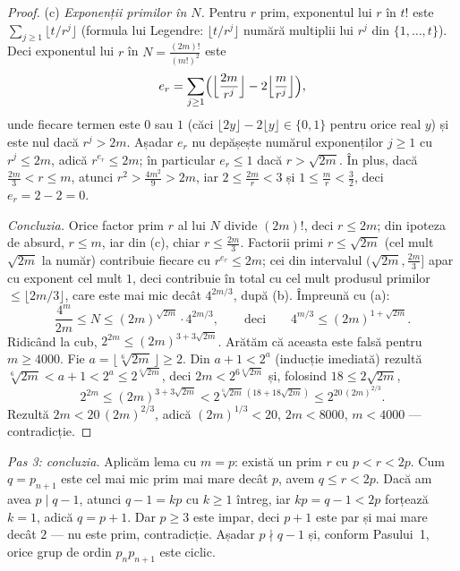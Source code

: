 \begin{solutie}
\begin{proof}
(c) \emph{Exponenții primilor în $N$.} Pentru $r$ prim, exponentul lui
$r$ în $t!$ este $\sum_{j\ge 1}\lfloor t/r^{j}\rfloor$ (formula lui
Legendre: $\lfloor t/r^{j}\rfloor$ numără multiplii lui $r^{j}$ din
$\{1,\dots,t\}$). Deci exponentul lui $r$ în $N=\frac{(2m)!}{(m!)^{2}}$
este
\[
  e_{r}=\sum_{j\ge 1}\Bigl(\Bigl\lfloor\frac{2m}{r^{j}}\Bigr\rfloor
  -2\Bigl\lfloor\frac{m}{r^{j}}\Bigr\rfloor\Bigr),
\]
unde fiecare termen este $0$ sau $1$ (căci
$\lfloor 2y\rfloor-2\lfloor y\rfloor\in\{0,1\}$ pentru orice real $y$)
și este nul dacă $r^{j}>2m$. Așadar $e_{r}$ nu depășește numărul
exponenților $j\ge 1$ cu $r^{j}\le 2m$, adică $r^{e_{r}}\le 2m$; în
particular $e_{r}\le 1$ dacă $r>\sqrt{2m}$. În plus, dacă
$\frac{2m}{3}<r\le m$, atunci $r^{2}>\frac{4m^{2}}{9}>2m$, iar
$2\le\frac{2m}{r}<3$ și $1\le\frac{m}{r}<\frac32$, deci $e_{r}=2-2=0$.

\emph{Concluzia.} Orice factor prim $r$ al lui $N$ divide $(2m)!$, deci
$r\le 2m$; din ipoteza de absurd, $r\le m$, iar din (c), chiar
$r\le\frac{2m}{3}$. Factorii primi $r\le\sqrt{2m}$ (cel mult
$\sqrt{2m}$ la număr) contribuie fiecare cu $r^{e_{r}}\le 2m$; cei din
intervalul $\bigl(\sqrt{2m},\frac{2m}{3}\bigr]$ apar cu exponent cel mult
$1$, deci contribuie în total cu cel mult produsul primilor
$\le\lfloor 2m/3\rfloor$, care este mai mic decât $4^{2m/3}$, după (b).
Împreună cu (a):
\[
  \frac{4^{m}}{2m}\le N\le(2m)^{\sqrt{2m}}\cdot 4^{2m/3},
  \qquad\text{deci}\qquad 4^{m/3}\le(2m)^{1+\sqrt{2m}} .
\]
Ridicând la cub, $2^{2m}\le(2m)^{3+3\sqrt{2m}}$. Arătăm că aceasta
este falsă pentru $m\ge 4000$. Fie
$a=\bigl\lfloor\sqrt[6]{2m}\,\bigr\rfloor\ge 2$. Din $a+1<2^{a}$
(inducție imediată) rezultă
$\sqrt[6]{2m}<a+1<2^{a}\le 2^{\sqrt[6]{2m}}$, deci
$2m<2^{6\sqrt[6]{2m}}$ și, folosind $18\le 2\sqrt{2m}$,
\[
  2^{2m}\le(2m)^{3+3\sqrt{2m}}<2^{\sqrt[6]{2m}\,(18+18\sqrt{2m})}
  \le 2^{20\,(2m)^{2/3}} .
\]
Rezultă $2m<20\,(2m)^{2/3}$, adică $(2m)^{1/3}<20$, $2m<8000$,
$m<4000$ --- contradicție.
\end{proof}

\smallskip
\textit{Pas 3: concluzia.} Aplicăm lema cu $m=p$: există un prim $r$ cu
$p<r<2p$. Cum $q=p_{n+1}$ este cel mai mic prim mai mare decât $p$,
avem $q\le r<2p$. Dacă am avea $p\mid q-1$, atunci $q-1=kp$ cu
$k\ge 1$ întreg, iar $kp=q-1<2p$ forțează $k=1$, adică $q=p+1$. Dar
$p\ge 3$ este impar, deci $p+1$ este par și mai mare decât $2$ --- nu
este prim, contradicție. Așadar $p\nmid q-1$ și, conform Pasului~1,
orice grup de ordin $p_{n}p_{n+1}$ este ciclic.
\end{solutie}


